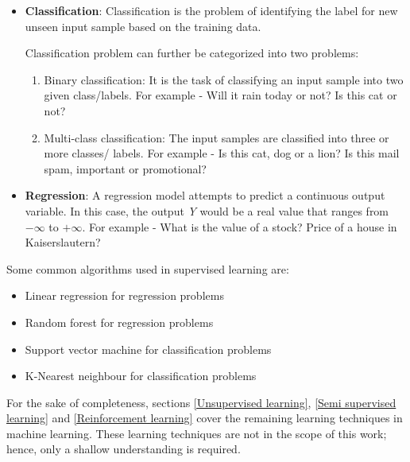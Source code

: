 \begin{itemize}
  \item \textbf{Classification}: Classification is the problem of identifying the label for new unseen input sample based on the training data. 
 
  \par
 
     Classification problem can further be categorized into two problems:
 
  \begin{enumerate}
      \item Binary classification: It is the task of classifying an input sample into two given class/labels.
      \newline
      For example - Will it rain today or not? Is this cat or not?
      \item Multi-class classification: The input samples are classified into three or more classes/ labels.  
      \newline
      For example - Is this cat, dog or a lion? Is this mail spam, important or promotional?
  \end{enumerate}
 
 \item \textbf{Regression}: A regression model attempts to predict a continuous output variable. In this case, the output \textit{Y} would be a real value that ranges from $-\infty$ to $+\infty.$ 
  \newline
  For example - What is the value of a stock? Price of a house in Kaiserslautern?  
\end{itemize}

\par

Some common algorithms used in supervised learning are:

\begin{itemize}
    \item Linear regression for regression problems
    \item Random forest for regression problems
    \item Support vector machine for classification
    problems
    \item K-Nearest neighbour for classification problems
\end{itemize}

For the sake of completeness, sections \ref{Unsupervised learning}, \ref{Semi supervised learning} and \ref{Reinforcement learning} cover the remaining learning techniques in machine learning. These learning techniques are not in the scope of this work; hence, only a shallow understanding is required. 

